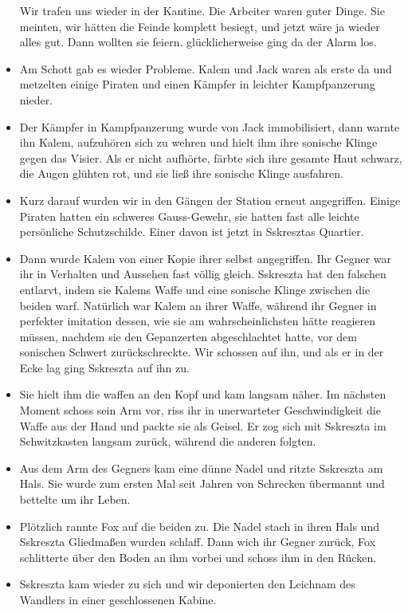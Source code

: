 \documentclass[11pt]{scrartcl}
\begin{document}
\begin{itemize}
  Wir trafen uns wieder in der Kantine. Die Arbeiter waren guter Dinge.
  Sie meinten, wir hätten die Feinde komplett besiegt, und jetzt wäre ja
  wieder alles gut. Dann wollten sie feiern. glücklicherweise ging da
  der Alarm los.
\item
  Am Schott gab es wieder Probleme. Kalem und Jack waren als erste da
  und metzelten einige Piraten und einen Kämpfer in leichter
  Kampfpanzerung nieder.
\item
  Der Kämpfer in Kampfpanzerung wurde von Jack immobilisiert, dann
  warnte ihn Kalem, aufzuhören sich zu wehren und hielt ihm ihre
  sonische Klinge gegen das Visier. Als er nicht aufhörte, färbte sich
  ihre gesamte Haut schwarz, die Augen glühten rot, und sie ließ ihre
  sonische Klinge ausfahren.
\item
  Kurz darauf wurden wir in den Gängen der Station erneut angegriffen.
  Einige Piraten hatten ein schweres Gauss-Gewehr, sie hatten fast alle
  leichte persönliche Schutzschilde. Einer davon ist jetzt in Sskresztas
  Quartier.
\item
  Dann wurde Kalem von einer Kopie ihrer selbst angegriffen. Ihr Gegner
  war ihr in Verhalten und Aussehen fast völlig gleich. Sskreszta hat
  den falschen entlarvt, indem sie Kalems Waffe und eine sonische Klinge
  zwischen die beiden warf. Natürlich war Kalem an ihrer Waffe, während
  ihr Gegner in perfekter imitation dessen, wie sie am
  wahrscheinlichsten hätte reagieren müssen, nachdem sie den Gepanzerten
  abgeschlachtet hatte, vor dem sonischen Schwert zurückschreckte. Wir
  schossen auf ihn, und als er in der Ecke lag ging Sskreszta auf ihn
  zu.
\item
  Sie hielt ihm die waffen an den Kopf und kam langsam näher. Im
  nächsten Moment schoss sein Arm vor, riss ihr in unerwarteter
  Geschwindigkeit die Waffe aus der Hand und packte sie als Geisel. Er
  zog sich mit Sskreszta im Schwitzkasten langsam zurück, während die
  anderen folgten.
\item
  Aus dem Arm des Gegners kam eine dünne Nadel und ritzte Sskreszta am
  Hals. Sie wurde zum ersten Mal seit Jahren von Schrecken übermannt und
  bettelte um ihr Leben.
\item
  Plötzlich rannte Fox auf die beiden zu. Die Nadel stach in ihren Hals
  und Sskreszta Gliedmaßen wurden schlaff. Dann wich ihr Gegner zurück,
  Fox schlitterte über den Boden an ihm vorbei und schoss ihm in den
  Rücken.
\item
  Sskreszta kam wieder zu sich und wir deponierten den Leichnam des
  Wandlers in einer geschlossenen Kabine.

\end{itemize}
\end{document}
